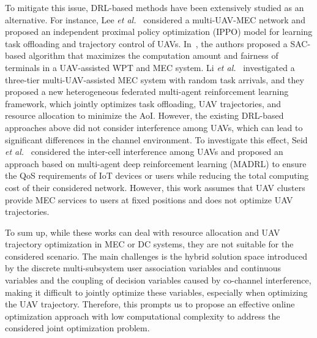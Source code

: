 \par To mitigate this issue, DRL-based methods have been extensively studied as an alternative. For instance, Lee \textit{et al.}~\cite{Lee2024} considered a multi-UAV-MEC network and proposed an independent proximal policy optimization (IPPO) model for learning task offloading and trajectory control of UAVs. In~\cite{Zhou2022}, the authors proposed a SAC-based algorithm that maximizes the computation amount and fairness of terminals in a UAV-assisted WPT and MEC system. Li \textit{et al.}~\cite{Li2024} investigated a three-tier multi-UAV-assisted MEC system with random task arrivals, and they proposed a new heterogeneous federated multi-agent reinforcement learning framework, which jointly optimizes task offloading, UAV trajectories, and resource allocation to minimize the AoI. However, the existing DRL-based approaches above did not consider interference among UAVs, which can lead to significant differences in the channel environment. To investigate this effect, Seid \textit{et al.}~\cite{seid2021} considered the inter-cell interference among UAVs and proposed an approach based on multi-agent deep reinforcement learning (MADRL) to ensure the QoS requirements of IoT devices or users while reducing the total computing cost of their considered network. However, this work assumes that UAV clusters provide MEC services to users at fixed positions and does not optimize UAV trajectories. 

\par To sum up, while these works can deal with resource allocation and UAV trajectory optimization in MEC or DC systems, they are not suitable for the considered scenario. The main challenges is the hybrid solution space introduced by the discrete multi-subsystem user association variables and continuous variables and the coupling of decision variables caused by co-channel interference, making it difficult to jointly optimize these variables, especially when optimizing the UAV trajectory. Therefore, this prompts us to propose an effective online optimization approach with low computational complexity to address the considered joint optimization problem.

